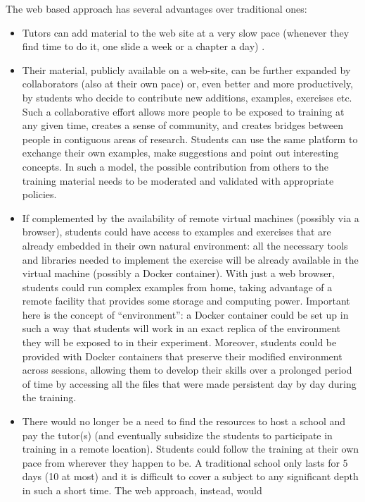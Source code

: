 \documentclass[12pt,a4paper]{article}
\begin{document}
The web based approach has several advantages over traditional ones:
\begin{itemize}
   \item Tutors can add material to the web site at a very slow pace (whenever
   they find time to do it, one slide a week or a chapter a day) .
   \item Their material, publicly available on a web-site, can be further
   expanded by collaborators (also at their own pace) or, even better and more productively, by students
   who decide to contribute new additions, examples, exercises etc. Such a
   collaborative effort allows more people to be exposed to training at any
   given time, creates a sense of community, and creates bridges between people
   in contiguous areas of research. Students can use the same platform to
   exchange their own examples, make suggestions and point out interesting
   concepts. In such a model, the possible contribution from others to the
   training material needs to be moderated and validated with appropriate
   policies.
   \item If complemented by the availability of remote virtual machines
   (possibly via a browser), students could have access to examples and
   exercises that are already embedded in their own natural environment: all the
   necessary tools and libraries needed to implement the exercise will be
   already available in the virtual machine (possibly a Docker container). With just a
   web browser, students could run complex examples from home, taking advantage
   of a remote facility that provides some storage and computing power.
   Important here is the concept of ``environment'': a Docker container could be
   set up in such a way that students will work in an exact replica of the
   environment they will be exposed to in their experiment. Moreover, students
   could be provided with Docker containers that
   preserve their modified environment across sessions, allowing them to
   develop their skills over a prolonged period of time by accessing all the
   files that were made persistent day by day during the training.
   \item There would no longer be a need to find the resources to host a school
   and pay the tutor(s) (and eventually subsidize the students to participate in
   training in a remote location). Students could follow the training at their
   own pace from wherever they happen to be. A traditional school only lasts for
   5 days (10 at most) and it is difficult to cover a  subject to any
   significant depth in such a short time. The web approach, instead, would

\end{itemize}
\end{document}
